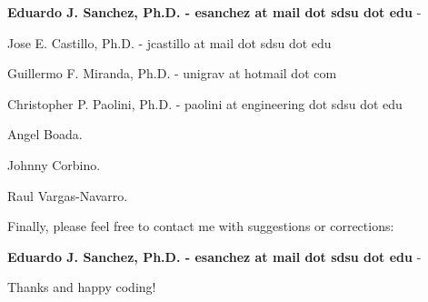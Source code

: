 \begin{DoxyPre}
\begin{DoxyItemize}
\item {\bfseries Eduardo J. Sanchez, Ph.D. - esanchez at mail dot sdsu dot edu} - 
\item Jose E. Castillo, Ph.D. - jcastillo at mail dot sdsu dot edu
\item Guillermo F. Miranda, Ph.D. - unigrav at hotmail dot com
\item Christopher P. Paolini, Ph.D. - paolini at engineering dot sdsu dot edu
\item Angel Boada.
\item Johnny Corbino.
\item Raul Vargas-Navarro.
\end{DoxyItemize}\end{DoxyPre}



\begin{DoxyPre}Finally, please feel free to contact me with suggestions or corrections:\end{DoxyPre}



\begin{DoxyPre}{\bfseries Eduardo J. Sanchez, Ph.D. - esanchez at mail dot sdsu dot edu} - \end{DoxyPre}



\begin{DoxyPre}Thanks and happy coding!
\end{DoxyPre}
 